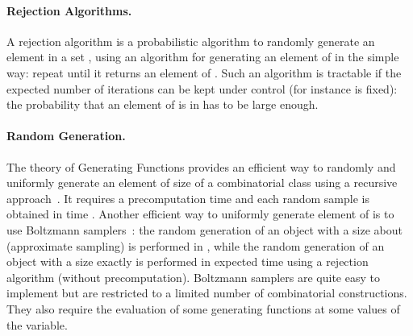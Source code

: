 \paragraph{Rejection Algorithms.}
A rejection algorithm is a probabilistic algorithm to randomly
generate an element in a set , using an algorithm  for
generating an element of  in the simple way: repeat  until it
returns an element of . Such an algorithm is tractable if the
expected number of iterations can be kept under control (for instance is
fixed): the probability that an element of  is in  has to be large
enough.

\paragraph{Random Generation.}
 The theory of Generating Functions provides an efficient way to randomly
 and uniformly generate an element of size  of a combinatorial class
  using a recursive approach~\cite{FSbook}. It requires a
  precomputation time and each random sample is obtained in time
 . Another efficient way to uniformly generate element of
  is to use Boltzmann
 samplers~\cite{DBLP:journals/cpc/DuchonFLS04}: the random generation of an
 object with a size about  (approximate sampling) is performed in ,
 while the random generation of an object with a size exactly  is
 performed in expected time  using a rejection algorithm (without
 precomputation). Boltzmann samplers are quite easy to implement but are
 restricted to a limited number of combinatorial constructions. They also
 require the evaluation of some generating functions at some values of the
 variable.



